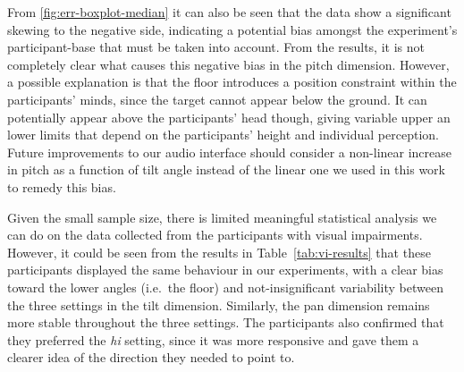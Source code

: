 \documentclass[sigconf, review=true, screen=true, anonymous=true]{acmart}
\begin{document}
From \cref{fig:err-boxplot-median} it can also be seen that the data show a significant skewing to the negative side, indicating a potential bias amongst the experiment's participant-base that must be taken into account.
From the results, it is not completely clear what causes this negative bias in the pitch dimension.
However, a possible explanation is that the floor introduces a position constraint within the participants' minds, since the target cannot appear below the ground.
It can potentially appear above the participants' head though, giving variable upper an lower limits that depend on the participants' height and individual perception.
Future improvements to our audio interface should consider a non-linear increase in pitch as a function of tilt angle instead of the linear one we used in this work to remedy this bias.


Given the small sample size, there is limited meaningful statistical analysis we can do on the data collected from the participants with visual impairments.
However, it could be seen from the results in Table~\ref{tab:vi-results} that these participants displayed the same behaviour in our experiments, with a clear bias toward the lower angles (i.e.\ the floor) and not-insignificant variability between the three settings in the tilt dimension.
Similarly, the pan dimension remains more stable throughout the three settings.
The participants also confirmed that they preferred the \emph{hi} setting, since it was more responsive and gave them a clearer idea of the direction they needed to point to. 
\end{document}
